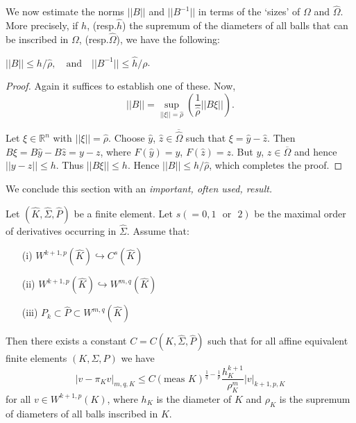 We now estimate the norms $||B||$ and $||B^{-1}||$ in terms of the
`sizes' of $\Omega$ and $\hat{\Omega}$. More precisely, if $h$,
(resp.\@ $\hat{h}$) the supremum of the diameters of all balls that
can be inscribed in $\Omega$, (resp.\@ $\hat{\Omega}$), we have the
following: 

\begin{theorem}\label{chap6-thm6.5}
$||B||\leq h/\hat{\rho},\quad\text{and}\quad ||B^{-1}||\leq \hat{h}/\rho$.
\end{theorem}

\begin{proof}
Again it suffices to establish one of these. Now,
$$
||B||=\sup\limits_{||\xi||=\hat{\rho}}\left(\frac{1}{\hat{\rho}}||B\xi||\right). 
$$

Let $\xi\in\mathbb{R}^{n}$ with $||\xi||=\hat{\rho}$. Choose
$\hat{y}$, $\hat{z}\in\overline{\hat{\Omega}}$ such that
$\xi=\hat{y}-\hat{z}$. Then $B\xi=B\hat{y}-B\hat{z}=y-z$, where
$F(\hat{y})=y$, $F(\hat{z})=z$. But $y$, $z\in\overline{\Omega}$ and
hence $||y-z||\leq h$. Thus $||B\xi||\leq h$. Hence $||B||\leq
h/\hat{\rho}$, which completes the proof.
\end{proof}

We conclude this section with an {\em important, often used, result.}

\begin{theorem}\label{chap6-thm6.6}
Let $(\hat{K},\hat{\Sigma},\hat{P})$ be a finite element. Let
$s(=0,1\text{~ or~ }2)$ be the maximal order of derivatives occurring
in $\hat{\Sigma}$. Assume that: 
\begin{itemize}
\item[(i)] $W^{k+1,p}(\hat{K})\hookrightarrow
  C^{s}(\hat{K})$\pageoriginale

\item[(ii)] $W^{k+1,p}(\hat{K})\hookrightarrow W^{m,q}(\hat{K})$

\item[(iii)] $P_{k}\subset \hat{P}\subset W^{m,q}(\hat{K})$
\end{itemize}

Then there exists a constant $C=C(\hat{K},\hat{\Sigma},\hat{P})$ such
that for all affine equivalent finite elements $(K,\Sigma,P)$ we have
\begin{equation*}
|v-\pi_{K}v|_{m,q,K}\leq C(\text{meas~}K)^{\frac{1}{q}-\frac{1}{p}}\frac{h^{k+1}_{K}}{\rho^{m}_{K}}|v|_{k+1,p,K}\tag{6.16}\label{chap6-eq6.16}
\end{equation*}
for all $v\in W^{k+1,p}(K)$, where $h_{K}$ is the diameter of $K$ and
$\rho_{K}$ is the supremum of diameters of all balls inscribed in $K$.
\end{theorem}


